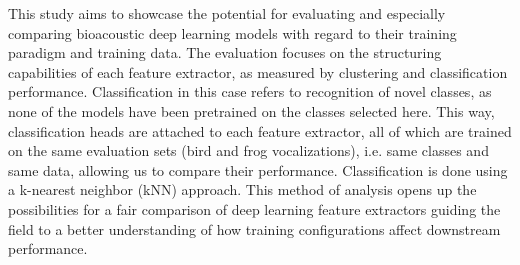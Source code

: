This study aims to showcase the potential for evaluating and especially comparing bioacoustic deep learning models with regard to their training paradigm and training data.
The evaluation focuses on the structuring capabilities of each feature extractor, as measured by clustering and classification performance.
Classification in this case refers to recognition of novel classes, as none of the models have been pretrained on the classes selected here.
This way, classification heads are attached to each feature extractor, all of which are trained on the same evaluation sets (bird and frog vocalizations), i.e. same classes and same data, allowing us to compare their performance.
Classification is done using a k-nearest neighbor (kNN) approach.
This method of analysis opens up the possibilities for a fair comparison of deep learning feature extractors guiding the field to a better understanding of how training configurations affect downstream performance.




